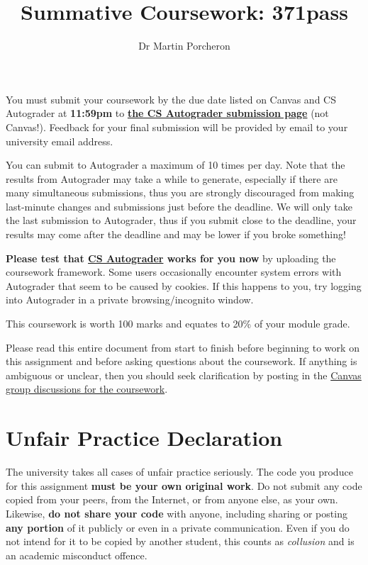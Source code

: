 \documentclass[a4paper]{article}
\title{Summative Coursework: 371pass}
\author{Dr Martin Porcheron}
\date{}
\newcommand\autograderlink{\href{https://csautograder.swansea.ac.uk/}{CS Autograder}}
\newcommand\submissionlink{\href{https://csautograder.swansea.ac.uk/web/project/31}{the CS Autograder submission page}}
\newcommand\totalmarks{{100} }
\begin{document}
\maketitle


You must submit your coursework by the due date listed on Canvas and CS Autograder at \textbf{11:59pm} to \textbf{\submissionlink{}} (not Canvas!). Feedback for your final submission will be provided by email to your university email address.

You can submit to Autograder a maximum of 10 times per day. Note that the results from Autograder may take a while to generate, especially if there are many simultaneous submissions, thus you are strongly discouraged from making last‑minute changes and submissions just before the deadline. We will only take the last submission to Autograder, thus if you submit close to the deadline, your results may come after the deadline and may be lower if you broke something!

\textbf{Please test that \autograderlink{} works for you now} by uploading the coursework framework. Some users occasionally encounter system errors with Autograder that seem to be caused by cookies. If this happens to you, try logging into Autograder in a private browsing/incognito window.

This coursework is worth \totalmarks{} marks and equates to 20\% of your module grade.

Please read this entire document from start to finish before beginning to work on this assignment and before asking questions about the coursework. If anything is ambiguous or unclear, then you should seek clarification by posting in the \href{https://canvas.swansea.ac.uk/courses/24793/discussion_topics/217912}{Canvas group discussions for the coursework}.





\section*{Unfair Practice Declaration}\label{sec:unfair-practice}
The university takes all cases of unfair practice seriously. The code you produce for this assignment \textbf{must be your own original work}. Do not submit any code copied from your peers, from the Internet, or from anyone else, as your own. Likewise, \textbf{do not share your code} with anyone, including sharing or posting \textbf{any portion} of it publicly or even in a private communication. Even if you do not intend for it to be copied by another student, this counts as \emph{collusion} and is an academic misconduct offence.
\end{document}
